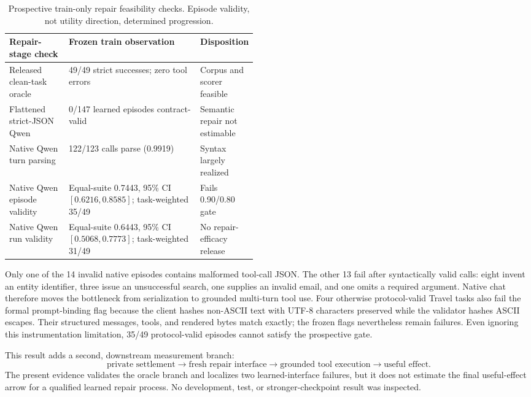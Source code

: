\documentclass[10pt]{article}
\begin{document}
\begin{table}[htbp]
\centering
\small
\begin{tabularx}{\linewidth}{@{}>{\raggedright\arraybackslash}p{0.24\linewidth}X>{\raggedright\arraybackslash}p{0.23\linewidth}@{}}
\toprule
\textbf{Repair-stage check} & \textbf{Frozen train observation} & \textbf{Disposition} \\
\midrule
Released clean-task oracle & 49/49 strict successes; zero tool errors & Corpus and scorer feasible \\
Flattened strict-JSON Qwen & 0/147 learned episodes contract-valid & Semantic repair not estimable \\
Native Qwen turn parsing & 122/123 calls parse (0.9919) & Syntax largely realized \\
Native Qwen episode validity & Equal-suite 0.7443, 95\% CI $[0.6216,0.8585]$; task-weighted 35/49 & Fails 0.90/0.80 gate \\
Native Qwen run validity & Equal-suite 0.6443, 95\% CI $[0.5068,0.7773]$; task-weighted 31/49 & No repair-efficacy release \\
\bottomrule
\end{tabularx}
\caption{Prospective train-only repair feasibility checks. Episode validity, not utility direction, determined progression.}
\label{tab:repairfeasibility}
\end{table}
\FloatBarrier

Only one of the 14 invalid native episodes contains malformed tool-call JSON. The other 13 fail after syntactically valid calls: eight invent an entity identifier, three issue an unsuccessful search, one supplies an invalid email, and one omits a required argument. Native chat therefore moves the bottleneck from serialization to grounded multi-turn tool use. Four otherwise protocol-valid Travel tasks also fail the formal prompt-binding flag because the client hashes non-ASCII text with UTF-8 characters preserved while the validator hashes ASCII escapes. Their structured messages, tools, and rendered bytes match exactly; the frozen flags nevertheless remain failures. Even ignoring this instrumentation limitation, 35/49 protocol-valid episodes cannot satisfy the prospective gate.

This result adds a second, downstream measurement branch:
\[
\text{private settlement}
\longrightarrow \text{fresh repair interface}
\longrightarrow \text{grounded tool execution}
\longrightarrow \text{useful effect}.
\]
The present evidence validates the oracle branch and localizes two learned-interface failures, but it does not estimate the final useful-effect arrow for a qualified learned repair process. No development, test, or stronger-checkpoint result was inspected.
\end{document}
